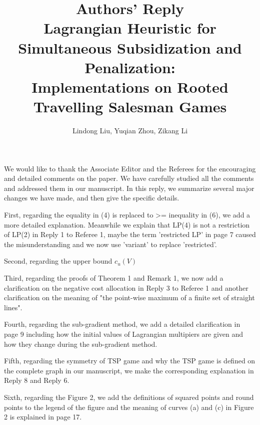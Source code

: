 \documentclass[11pt]{article}
\title{\textbf{Authors' Reply\\Lagrangian Heuristic for Simultaneous Subsidization and Penalization:\\
Implementations on Rooted Travelling Salesman Games}}
\author{Lindong Liu, Yuqian Zhou, Zikang Li}
\date{}
\begin{document}
\maketitle
\noindent

We would like to thank the Associate Editor and the Referees for the encouraging and detailed comments on the paper. We have carefully studied all the comments and addressed them in our manuscript.
In this reply, we summarize several major changes we have made, and then give the specific details.

First, regarding the equality in (4) is replaced to >= inequality in (6), we add a more detailed explanation. Meanwhile we explain that LP(4) is not a restriction of LP(2) in Reply 1 to Referee 1, maybe the term 'restricted LP' in page 7 caused the misunderstanding and we now use 'variant' to replace 'restricted'.

Second, regarding the upper bound $c_u(V)$

Third, regarding the proofs of Theorem 1 and Remark 1, we now add a clarification on the negative cost allocation in Reply 3 to Referee 1 and another clarification on the meaning of "the point-wise maximum of a finite set of straight lines".


Fourth, regarding the sub-gradient method, we add a detailed clarification in page 9 including how the initial values of Lagrangian multipiers are given and how they change during the sub-gradient method.


Fifth, regarding the symmetry of TSP game and why the TSP game is defined on the complete graph in our manuscript, we make the corresponding explanation in Reply 8 and Reply 6.

Sixth, regarding the Figure 2, we add the definitions of squared points and round points to the legend of the figure and the meaning of curves (a) and (c) in Figure 2 is explained in page 17.
\end{document}
